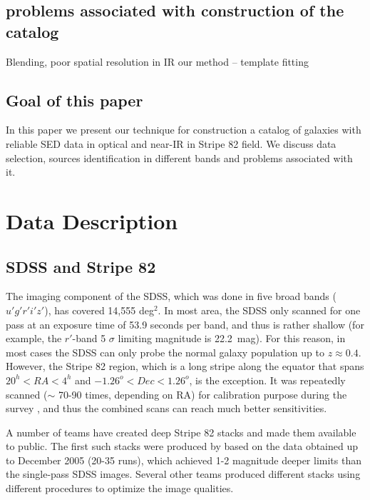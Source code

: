 \documentclass[numberedappendix,apj,twocolumn]{emulateapj}
\begin{document}
\subsection{problems associated with construction of the catalog}
Blending, poor spatial resolution in IR
our method – template fitting

\subsection{Goal of this paper}

In this paper we present our technique for construction a catalog of galaxies with reliable SED data in optical and near-IR in Stripe 82 field. We discuss data selection, sources identification in different bands and problems associated with it.

\section{Data Description}


\subsection{SDSS and Stripe 82}

The imaging component of the SDSS, which was done in five broad bands ($u' g' r' i' z'$), has covered 14,555 deg$^2$. In most area, the SDSS only scanned for one pass at an exposure time of 53.9 seconds per band, and thus is rather shallow (for example, the $r'$-band 5 $\sigma$ limiting magnitude is 22.2~mag). For this reason, in most cases the SDSS can only probe the normal galaxy population up to $z\approx 0.4$. However, the Stripe 82 region, which is a long stripe along the equator that spans $20^h < RA < 4^h$ and $-1.26^o < Dec < 1.26^o$, is the exception. It was repeatedly scanned ($\sim$ 70-90 times, depending on RA) for calibration purpose during the survey \citep{Adelman-McCarthy2007}, and thus the combined scans can reach much better sensitivities.

A number of teams have created deep Stripe 82 stacks and made them available to public. The first such stacks were produced by \citet[][]{Annis2014} based on the data obtained up to December 2005 (20-35 runs), which achieved 1-2 magnitude deeper limits than the single-pass SDSS images. Several other teams \citep[e.g.,][]{2009AJ....138..305J, 2014MNRAS.440.1296H} produced different stacks using different procedures to optimize the image qualities.
\end{document}
